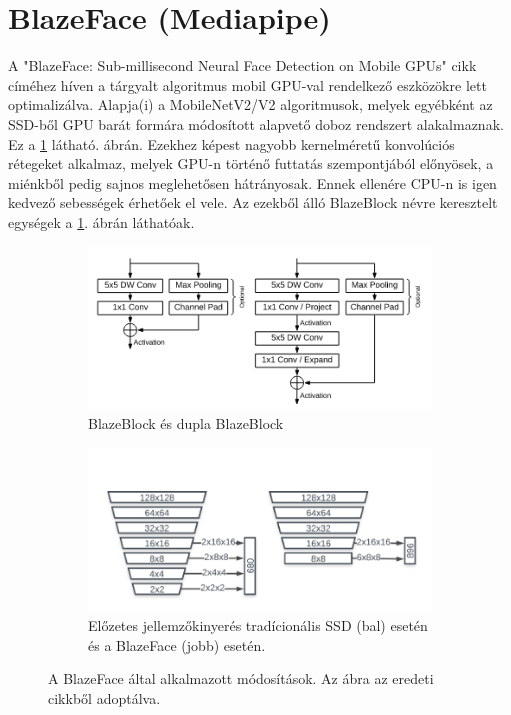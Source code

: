 \section{BlazeFace (Mediapipe)}
A "BlazeFace: Sub-millisecond Neural Face Detection on Mobile GPUs"\cite{bazarevsky_blazeface_2019} cikk címéhez híven a tárgyalt algoritmus mobil GPU-val rendelkező eszközökre lett optimalizálva. Alapja(i) a MobileNetV2/V2 \cite{howard_mobilenets_2017, sandler_mobilenetv2_2019} algoritmusok, melyek egyébként az SSD-ből GPU barát formára módosított alapvető doboz rendszert alakalmaznak. Ez a \ref{fig:blazeface} látható. ábrán. Ezekhez képest nagyobb kernelméretű konvolúciós rétegeket alkalmaz, melyek GPU-n történő futtatás szempontjából előnyösek, a miénkből pedig sajnos meglehetősen hátrányosak. Ennek ellenére CPU-n is igen kedvező sebességek érhetőek el vele. Az ezekből álló BlazeBlock névre keresztelt egységek a \ref{fig:blazeface}. ábrán láthatóak.

\begin{figure}[h]
    \centering
    \begin{subfigure}[b]{0.45\linewidth}
        \includegraphics[width=\linewidth]{figures/blaze_block.png}
        \caption{BlazeBlock és dupla BlazeBlock}
    \end{subfigure}
    \begin{subfigure}[b]{0.45\linewidth}
        \includegraphics[width=\linewidth]{figures/blazeface_anchor_computation_vs_ssd.png}
        \caption{Előzetes jellemzőkinyerés tradícionális SSD (bal) esetén és a BlazeFace (jobb) esetén.}
    \end{subfigure}
    \caption{A BlazeFace által alkalmazott módosítások. Az ábra az eredeti cikkből\cite{bazarevsky_blazeface_2019} adoptálva.}
    \label{fig:blazeface}
\end{figure}

